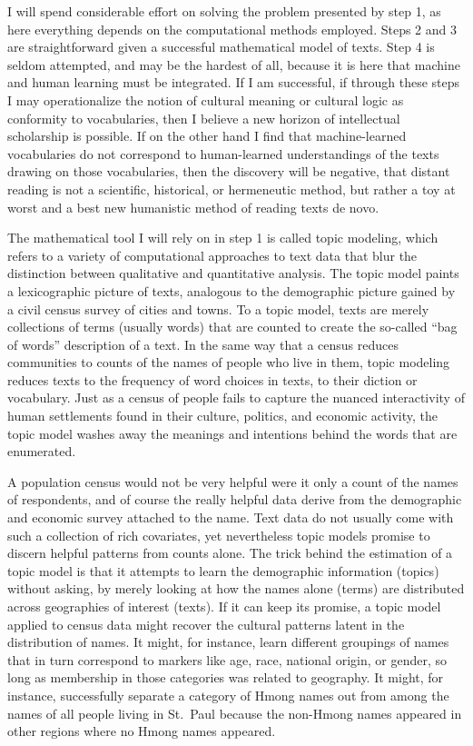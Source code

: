 \documentclass[]{book}
\begin{document}
I will spend considerable effort on solving the problem presented by
step 1, as here everything depends on the computational methods
employed. Steps 2 and 3 are straightforward given a successful
mathematical model of texts. Step 4 is seldom attempted, and may be the
hardest of all, because it is here that machine and human learning must
be integrated. If I am successful, if through these steps I may
operationalize the notion of cultural meaning or cultural logic as
conformity to vocabularies, then I believe a new horizon of intellectual
scholarship is possible. If on the other hand I find that
machine-learned vocabularies do not correspond to human-learned
understandings of the texts drawing on those vocabularies, then the
discovery will be negative, that distant reading is not a scientific,
historical, or hermeneutic method, but rather a toy at worst and a best
new humanistic method of reading texts de novo.

The mathematical tool I will rely on in step 1 is called topic modeling,
which refers to a variety of computational approaches to text data that
blur the distinction between qualitative and quantitative analysis. The
topic model paints a lexicographic picture of texts, analogous to the
demographic picture gained by a civil census survey of cities and towns.
To a topic model, texts are merely collections of terms (usually words)
that are counted to create the so-called ``bag of words'' description of
a text. In the same way that a census reduces communities to counts of
the names of people who live in them, topic modeling reduces texts to
the frequency of word choices in texts, to their diction or vocabulary.
Just as a census of people fails to capture the nuanced interactivity of
human settlements found in their culture, politics, and economic
activity, the topic model washes away the meanings and intentions behind
the words that are enumerated.

A population census would not be very helpful were it only a count of
the names of respondents, and of course the really helpful data derive
from the demographic and economic survey attached to the name. Text data
do not usually come with such a collection of rich covariates, yet
nevertheless topic models promise to discern helpful patterns from
counts alone. The trick behind the estimation of a topic model is that
it attempts to learn the demographic information (topics) without
asking, by merely looking at how the names alone (terms) are distributed
across geographies of interest (texts). If it can keep its promise, a
topic model applied to census data might recover the cultural patterns
latent in the distribution of names. It might, for instance, learn
different groupings of names that in turn correspond to markers like
age, race, national origin, or gender, so long as membership in those
categories was related to geography. It might, for instance,
successfully separate a category of Hmong names out from among the names
of all people living in St.~Paul because the non-Hmong names appeared in
other regions where no Hmong names appeared.
\end{document}
